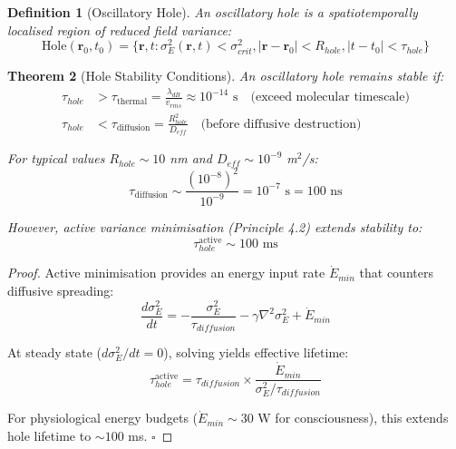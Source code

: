 \documentclass[12pt,a4paper]{article}
\newtheorem{theorem}{Theorem}[section]
\newtheorem{definition}[theorem]{Definition}
\begin{document}
\begin{definition}[Oscillatory Hole]
An oscillatory hole is a spatiotemporally localised region of reduced field variance:
\begin{equation}
\text{Hole}(\mathbf{r}_0, t_0) = \{\mathbf{r}, t : \sigma^2_E(\mathbf{r}, t) < \sigma^2_{crit}, |\mathbf{r} - \mathbf{r}_0| < R_{hole}, |t - t_0| < \tau_{hole}\}
\end{equation}
\end{definition}

\begin{theorem}[Hole Stability Conditions]
An oscillatory hole remains stable if:
\begin{align}
\tau_{hole} &> \tau_{\text{thermal}} = \frac{\lambda_{dB}}{v_{rms}} \approx 10^{-14} \text{ s} \quad \text{(exceed molecular timescale)} \\
\tau_{hole} &< \tau_{\text{diffusion}} = \frac{R_{hole}^2}{D_{eff}} \quad \text{(before diffusive destruction)}
\end{align}

For typical values $R_{hole} \sim 10$ nm and $D_{eff} \sim 10^{-9}$ m$^2$/s:
\begin{equation}
\tau_{\text{diffusion}} \sim \frac{(10^{-8})^2}{10^{-9}} = 10^{-7} \text{ s} = 100 \text{ ns}
\end{equation}

However, active variance minimisation (Principle 4.2) extends stability to:
\begin{equation}
\tau_{hole}^{\text{active}} \sim 100 \text{ ms}
\end{equation}
\end{theorem}

\begin{proof}
Active minimisation provides an energy input rate $\dot{E}_{min}$ that counters diffusive spreading:
\begin{equation}
\frac{d\sigma^2_E}{dt} = -\frac{\sigma^2_E}{\tau_{diffusion}} - \gamma \nabla^2\sigma^2_E + \dot{E}_{min}
\end{equation}

At steady state ($d\sigma^2_E/dt = 0$), solving yields effective lifetime:
\begin{equation}
\tau_{hole}^{\text{active}} = \tau_{diffusion} \times \frac{\dot{E}_{min}}{\sigma^2_E / \tau_{diffusion}}
\end{equation}

For physiological energy budgets ($\dot{E}_{min} \sim 30$ W for consciousness), this extends hole lifetime to $\sim 100$ ms. $\square$
\end{proof}
\end{document}
